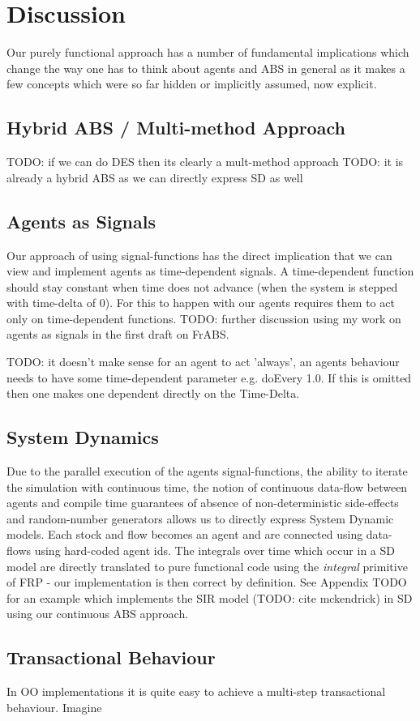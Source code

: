 \section{Discussion}
Our purely functional approach has a number of fundamental implications which change the way one has to think about agents and ABS in general as it makes a few concepts which were so far hidden or implicitly assumed, now explicit. 

\subsection{Hybrid ABS / Multi-method Approach}
TODO: if we can do DES then its clearly a mult-method approach
TODO: it is already a hybrid ABS as we can directly express SD as well

\subsection{Agents as Signals}
Our approach of using signal-functions has the direct implication that we can view and implement agents as time-dependent signals. A time-dependent function should stay constant when time does not advance (when the system is stepped with time-delta of 0). For this to happen with our agents requires them to act only on time-dependent functions. TODO: further discussion using my work on agents as signals in the first draft on FrABS.

TODO: it doesn't make sense for an agent to act 'always', an agents behaviour needs to have some time-dependent parameter e.g. doEvery 1.0. If this is omitted then one makes one dependent directly on the Time-Delta.

\subsection{System Dynamics}
Due to the parallel execution of the agents signal-functions, the ability to iterate the simulation with continuous time, the notion of continuous data-flow between agents and compile time guarantees of absence of non-deterministic side-effects and random-number generators allows us to directly express System Dynamic models.
Each stock and flow becomes an agent and are connected using data-flows using hard-coded agent ids. The integrals over time which occur in a SD model are directly translated to pure functional code using the \textit{integral} primitive of FRP - our implementation is then correct by definition.
See Appendix TODO for an example which implements the SIR model (TODO: cite mckendrick) in SD using our continuous ABS approach.

\subsection{Transactional Behaviour}
In OO implementations it is quite easy to achieve a multi-step transactional behaviour. Imagine 